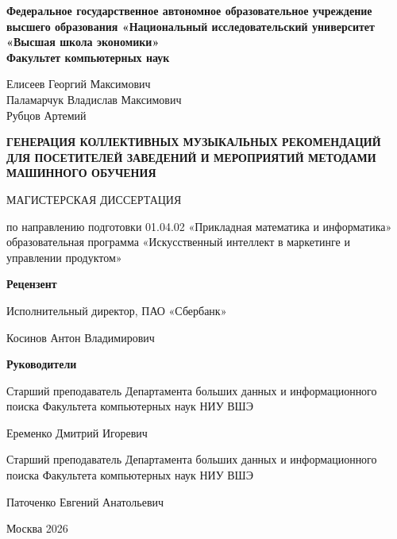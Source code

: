 \begin{titlepage}
\thispagestyle{empty}

\begin{center}

\vspace*{0.1cm}

{\small\bfseries
Федеральное государственное автономное образовательное учреждение высшего образования «Национальный исследовательский университет «Высшая школа экономики»\\
Факультет компьютерных наук
}

\vspace{0.5cm}

{
Елисеев Георгий Максимович\\
Паламарчук Владислав Максимович\\
Рубцов Артемий
}

\vspace{0.5cm}

{\bfseries
ГЕНЕРАЦИЯ КОЛЛЕКТИВНЫХ МУЗЫКАЛЬНЫХ РЕКОМЕНДАЦИЙ ДЛЯ ПОСЕТИТЕЛЕЙ ЗАВЕДЕНИЙ И МЕРОПРИЯТИЙ МЕТОДАМИ МАШИННОГО ОБУЧЕНИЯ
}

{МАГИСТЕРСКАЯ ДИССЕРТАЦИЯ}

{\small
по направлению подготовки 01.04.02 «Прикладная математика и информатика»
образовательная программа «Искусственный интеллект в маркетинге и\\
управлении продуктом»
}

\end{center}

\vfill

\noindent
\begin{minipage}[t]{0.45\textwidth}
\textbf{Рецензент}

\vspace{0.6cm}

{\small
Исполнительный директор, ПАО «Сбербанк»
}

{\small
Косинов Антон Владимирович
}
\end{minipage}
\hfill
\begin{minipage}[t]{0.45\textwidth}
\raggedleft
\textbf{Руководители}

\vspace{0.6cm}

{\small
Старший преподаватель Департамента больших данных и информационного поиска Факультета компьютерных наук НИУ ВШЭ
}

{\small
Еременко Дмитрий Игоревич
}

\vspace{0.8cm}

{\small
Старший преподаватель Департамента больших данных и информационного поиска Факультета компьютерных наук НИУ ВШЭ
}

{\small
Паточенко Евгений Анатольевич
}
\end{minipage}

\vspace{1.5cm}

\begin{center}
Москва 2026
\end{center}

\end{titlepage}
